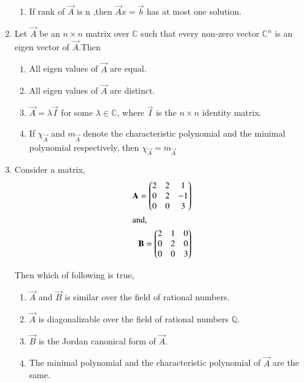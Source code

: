 \begin{enumerate}[label=\thesection.\arabic*.,ref=\thesection.\theenumi]
\begin{enumerate}
    \item If rank of $\vec{A}$ is n ,then $\vec{A}x=\vec{b}$ has at most one solution.\ 
    \end{enumerate}
%
\solution

\item Let $\vec{A}$ be an $n\times n$ matrix over $\mathbb{C}$ such that every non-zero vector $\mathbb{C}^n$ is an eigen vector of $\vec{A}$.Then
\begin{enumerate}
    \item All eigen values of $\vec{A}$ are equal.
    \item All eigen values of $\vec{A}$ are distinct.
    \item $\vec{A}=\lambda\vec{I}$ for some $\lambda \in \mathbb{C}$, where $\vec{I}$ is the $n\times n$ identity matrix.
    \item If $\chi_\vec{A}$ and $m_\vec{A}$ denote the characteristic polynomial and the minimal polynomial respectively, then $\chi_\vec{A}=m_\vec{A}$
\end{enumerate}
%

\solution

\item 	Consider a matrix,
	\begin{align}
	\mathbf{A} = \begin{pmatrix}2 & 2 & 1 \\0 & 2 & -1 \\ 0 & 0 & 3\end{pmatrix}\\ \intertext{and,} \mathbf{B} = \begin{pmatrix}2 & 1 & 0 \\ 0 & 2 & 0 \\ 0 & 0 & 3\end{pmatrix}
	\end{align}
	
Then which of following is true,
\begin{enumerate}
\item $\vec{A}$ and $\vec{B}$ is similar over the field of rational numbers.
\item $\vec{A}$ is diagonalizable over the field of rational numbers $\mathbb{Q}$.
\item $\vec{B}$ is the Jordan canonical form of $\vec{A}$.
\item The minimal polynomial and the characteristic polynomial of $\vec{A}$ are the same.
\end{enumerate}
%
\solution


\end{enumerate}
